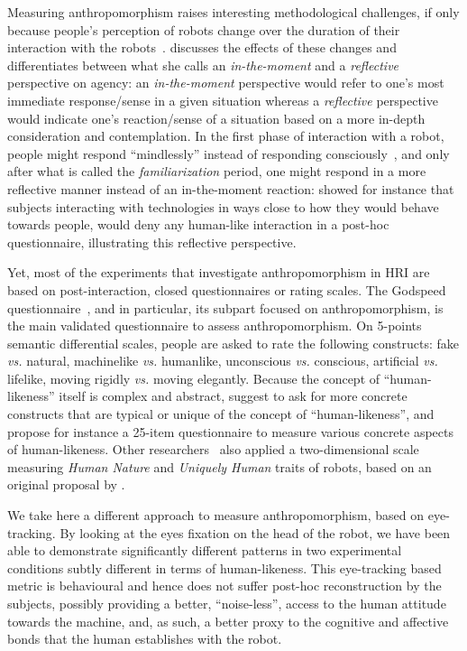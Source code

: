 \documentclass[lettersize, noapacite, twoside, HRI]{apa_HRI}
\newcommand{\vs}{\textit{vs.}\xspace}
\begin{document}
Measuring anthropomorphism raises
interesting methodological challenges, if only because people's perception of
robots change over the duration of their interaction with the
robots~\citep{lemaignan2014dynamics}. \citet{takayama_perspectives_2012}
discusses the effects of these changes and differentiates between what she calls
an \emph{in-the-moment} and a \emph{reflective} perspective on agency: an
\emph{in-the-moment} perspective would refer to one's most immediate
response/sense in a given situation whereas a \emph{reflective} perspective would
indicate one's reaction/sense of a situation based on a more in-depth
consideration and contemplation.  In the first phase of interaction with a
robot, people might respond ``mindlessly'' instead of responding
consciously~\citep{nass_machines_2000}, and only after what is called the
\emph{familiarization} period, one might respond in a more reflective manner
instead of an in-the-moment reaction: \citet{reeves_media_1996} showed for
instance that subjects interacting with technologies in ways close to how they
would behave towards people, would deny any human-like interaction in a post-hoc
questionnaire, illustrating this reflective perspective.

Yet, most of the experiments that investigate anthropomorphism in HRI are based
on post-interaction, closed questionnaires or rating scales.  The Godspeed
questionnaire~\citep{bartneck_measurement_2008}, and in particular, its subpart
focused on anthropomorphism, is the main validated questionnaire to assess
anthropomorphism. On 5-points semantic differential scales, people are asked to
rate the following constructs: fake \vs natural, machinelike \vs humanlike,
unconscious \vs conscious, artificial \vs lifelike, moving rigidly \vs moving
elegantly. Because the concept of ``human-likeness'' itself is complex and
abstract, \citet{kahn_jr._robotic_2006} suggest to ask for more concrete
constructs that are typical or unique of the concept of ``human-likeness'', and
\citet{ruijten_introducing_2014} propose for instance a 25-item questionnaire to
measure various concrete aspects of human-likeness. Other
researchers~\citep{zlotowski2014dimensions,salem2015would} also applied a
two-dimensional scale measuring \emph{Human Nature} and \emph{Uniquely Human}
traits of robots, based on an original proposal by \citet{haslam2008attributing}.

We take here a different approach to measure anthropomorphism, based on
eye-tracking.  By looking at the eyes fixation on the head of the robot, we have
been able to demonstrate significantly different patterns in two experimental
conditions subtly different in terms of human-likeness. This eye-tracking based
metric is behavioural and hence does not suffer post-hoc reconstruction by the
subjects, possibly providing a better, ``noise-less'', access to the human
attitude towards the machine, and, as such, a better proxy to the cognitive and
affective bonds that the human establishes with the robot.
\end{document}
